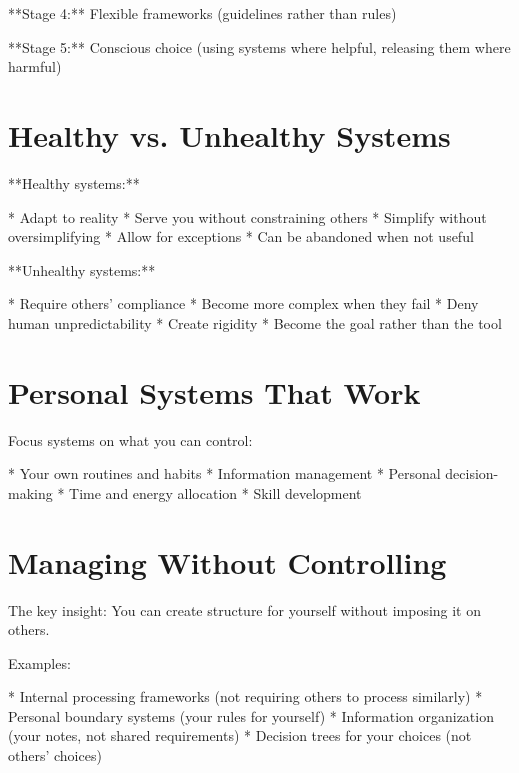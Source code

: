 \documentclass[12pt,oneside]{book}
\begin{document}
                **Stage 4:** Flexible frameworks (guidelines rather than rules)

                **Stage 5:** Conscious choice (using systems where helpful, releasing them where harmful)

\section{Healthy vs. Unhealthy Systems}

**Healthy systems:**

                    * Adapt to reality
                    * Serve you without constraining others
                    * Simplify without oversimplifying
                    * Allow for exceptions
                    * Can be abandoned when not useful

**Unhealthy systems:**

                    * Require others' compliance
                    * Become more complex when they fail
                    * Deny human unpredictability
                    * Create rigidity
                    * Become the goal rather than the tool

\section{Personal Systems That Work}

Focus systems on what you can control:

                    * Your own routines and habits
                    * Information management
                    * Personal decision-making
                    * Time and energy allocation
                    * Skill development

\section{Managing Without Controlling}

The key insight: You can create structure for yourself without imposing it on others.

Examples:

                    * Internal processing frameworks (not requiring others to process similarly)
                    * Personal boundary systems (your rules for yourself)
                    * Information organization (your notes, not shared requirements)
                    * Decision trees for your choices (not others' choices)
\end{document}
